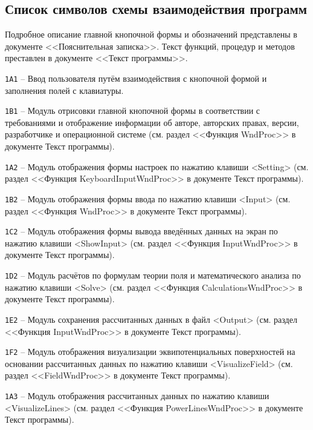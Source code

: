 \documentclass[14pt,a4paper,final]{extreport}
\begin{document}
\pagebreak

\setcounter{page}{1}
\subsection{Список символов схемы взаимодействия программ}

Подробное описание главной кнопочной формы и обозначений представлены в документе <<Пояснительная записка>>. Текст функций, процедур и методов преставлен в документе <<Текст программы>>.

\texttt{1A1} -- Ввод пользователя путём взаимодействия с кнопочной формой и заполнения полей с клавиатуры.

\texttt{1B1} -- Модуль отрисовки главной кнопочной формы в соответствии с требованиями и отображение
информации об авторе, авторских правах, версии, разработчике и операционной системе (см. раздел <<Функция WndProc>> в документе Текст программы).

\texttt{1A2} -- Модуль отображения формы настроек по нажатию клавиши <Setting> (см. раздел <<Функция KeyboardInputWndProc>> в документе Текст программы).

\texttt{1B2} -- Модуль отображения формы ввода по нажатию клавиши <Input> (см. раздел <<Функция WndProc>> в документе Текст программы).

\texttt{1C2} -- Модуль отображения формы вывода введённых данных на экран по нажатию клавиши <ShowInput> (см. раздел <<Функция InputWndProc>> в документе Текст программы).

\texttt{1D2} -- Модуль расчётов по формулам теории поля и математического анализа по нажатию клавиши <Solve> (см. раздел <<Функция CalculationsWndProc>> в документе Текст программы).

\texttt{1E2} -- Модуль сохранения рассчитанных данных в файл <Output> (см. раздел <<Функция InputWndProc>> в документе Текст программы).

\texttt{1F2} -- Модуль отображения визуализации эквипотенциальных поверхностей на основании
рассчитанных данных по нажатию клавиши <VisualizeField> (см. раздел <<FieldWndProc>> в документе Текст программы).

\texttt{1A3} -- Модуль отображения рассчитанных данных по нажатию клавиши <VisualizeLines> (см. раздел <<Функция PowerLinesWndProc>> в документе Текст программы).
\end{document}
